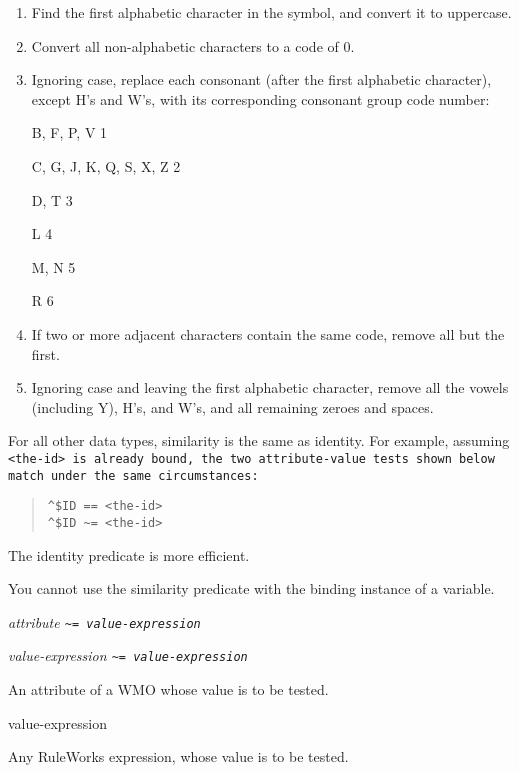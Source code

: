 \begin{enumerate}
\item Find the first alphabetic character in the symbol, and convert
  it to uppercase.
\item Convert all non-alphabetic characters to a code of 0.
\item Ignoring case, replace each consonant (after the first
  alphabetic character), except H's and W's, with its corresponding
  consonant group code number:

  B, F, P, V    1

  C, G, J, K, Q, S, X, Z  2

  D, T    3

  L     4

  M, N    5

  R     6
\item If two or more adjacent characters contain the same code, remove
  all but the first.
\item Ignoring case and leaving the first alphabetic character, remove
  all the vowels (including Y), H's, and W's, and all remaining zeroes
  and spaces.
\end{enumerate}

For all other data types, similarity is the same as identity.  For
example, assuming \tt{<the-id>} is already bound, the two
attribute-value tests shown below match under the same circumstances:

\begin{quote}
\begin{verbatim}
^$ID == <the-id>
^$ID ~= <the-id>
\end{verbatim}
\end{quote}

The identity predicate is more efficient.

You cannot use the similarity predicate with the binding instance of a
variable.

\Format

\ct\it{attribute} \tt{\~{}=} \it{value-expression}

\it{value-expression} \tt{\~{}=} \it{value-expression}

\begin{operands}
\item[\ct{attribute}]

  An attribute of a WMO whose value is to be tested.

\item[value-expression]

  Any RuleWorks expression, whose value is to be tested.
\end{operands}

